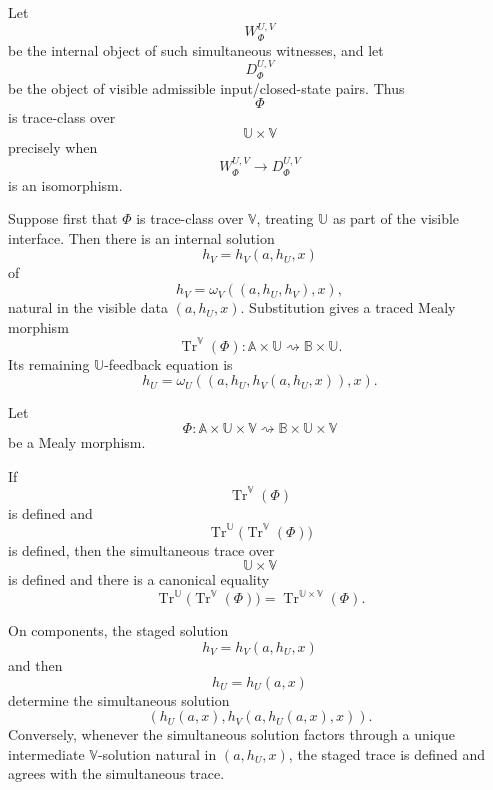 Let
\[
W_\Phi^{U,V}
\]
be the internal object of such simultaneous witnesses, and let
\[
D_\Phi^{U,V}
\]
be the object of visible admissible input/closed-state pairs.  Thus
\[
\Phi
\]
is trace-class over
\[
\mathbb U\times\mathbb V
\]
precisely when
\[
W_\Phi^{U,V}\to D_\Phi^{U,V}
\]
is an isomorphism.

Suppose first that \(\Phi\) is trace-class over \(\mathbb V\), treating
\(\mathbb U\) as part of the visible interface.  Then there is an internal
solution
\[
h_V=h_V(a,h_U,x)
\]
of
\[
h_V=\omega_V((a,h_U,h_V),x),
\]
natural in the visible data \((a,h_U,x)\).  Substitution gives a traced Mealy
morphism
\[
\operatorname{Tr}^{\mathbb V}(\Phi):
\mathbb A\times\mathbb U
\rightsquigarrow
\mathbb B\times\mathbb U.
\]
Its remaining \(\mathbb U\)-feedback equation is
\[
h_U=
\omega_U((a,h_U,h_V(a,h_U,x)),x).
\]

\begin{theorem}
\label{thm:staged-feedback}
Let
\[
\Phi:
\mathbb A\times\mathbb U\times\mathbb V
\rightsquigarrow
\mathbb B\times\mathbb U\times\mathbb V
\]
be a Mealy morphism.

If
\[
\operatorname{Tr}^{\mathbb V}(\Phi)
\]
is defined and
\[
\operatorname{Tr}^{\mathbb U}
\bigl(\operatorname{Tr}^{\mathbb V}(\Phi)\bigr)
\]
is defined, then the simultaneous trace over
\[
\mathbb U\times\mathbb V
\]
is defined and there is a canonical equality
\[
\operatorname{Tr}^{\mathbb U}
\bigl(\operatorname{Tr}^{\mathbb V}(\Phi)\bigr)
=
\operatorname{Tr}^{\mathbb U\times\mathbb V}(\Phi).
\]

On components, the staged solution
\[
h_V=h_V(a,h_U,x)
\]
and then
\[
h_U=h_U(a,x)
\]
determine the simultaneous solution
\[
(h_U(a,x),h_V(a,h_U(a,x),x)).
\]
Conversely, whenever the simultaneous solution factors through a unique
intermediate \(\mathbb V\)-solution natural in \((a,h_U,x)\), the staged trace
is defined and agrees with the simultaneous trace.
\end{theorem}

